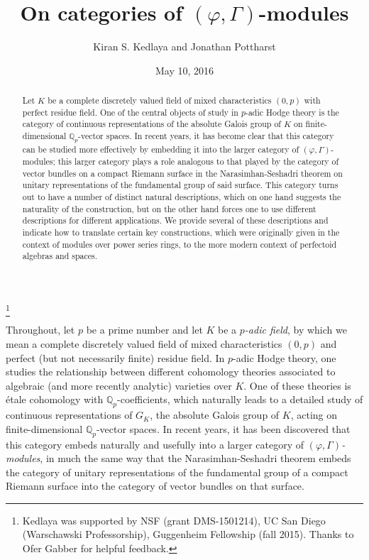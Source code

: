 \documentclass[12pt]{amsart}
\theoremstyle{definition}
\numberwithin{equation}{theorem}
\newcommand{\QQ}{\mathbb{Q}}
\begin{document}
\title{On categories of $(\varphi, \Gamma)$-modules}
\author{Kiran S. Kedlaya and Jonathan Pottharst}
\thanks{Kedlaya was supported by NSF (grant DMS-1501214), UC San Diego (Warschawski Professorship), Guggenheim Fellowship (fall 2015). Thanks to Ofer Gabber for helpful feedback.}
\date{May 10, 2016}

\begin{abstract}
Let $K$ be a complete discretely valued field of mixed characteristics $(0,p)$ with perfect residue field. One of the central objects of study in $p$-adic Hodge theory is the cate\-gory of continuous representations of the absolute Galois group of $K$ on finite-dimensional $\QQ_p$-vector spaces. In recent years, it has become clear that this category can be studied more effectively by embedding it into the larger category of $(\varphi, \Gamma)$-modules; this larger category plays a role analogous to that played by the category of vector bundles on a compact Riemann surface in the Narasimhan-Seshadri theorem on unitary representations of the fundamental group of said surface. This category turns out to have a number of distinct natural descriptions, which on one hand suggests the naturality of the construction, but on the other hand forces one to use different descriptions for different applications. We provide several of these descriptions and indicate how to translate certain key constructions, which were originally given in the context of modules over power series rings, to the more modern context of perfectoid algebras and spaces.
\end{abstract}

\maketitle

Throughout, let $p$ be a prime number and let $K$ be a \emph{$p$-adic field}, by which we mean a complete discretely valued field of mixed characteristics $(0,p)$ and perfect (but not necessarily finite) residue field. In $p$-adic Hodge theory, one studies the relationship between different cohomology theories associated to algebraic (and more recently analytic) varieties over $K$. One of these theories is \'etale cohomology with $\QQ_p$-coefficients, which naturally leads to a detailed study of continuous representations of $G_K$, the absolute Galois group of $K$, acting on finite-dimensional $\QQ_p$-vector spaces. In recent years, it has been discovered that this category embeds naturally and usefully into a larger category of \emph{$(\varphi, \Gamma)$-modules}, in much the same way that the Narasimhan-Seshadri theorem embeds the category of unitary representations of the fundamental group of a compact Riemann surface into the category of vector bundles on that surface.
\end{document}
